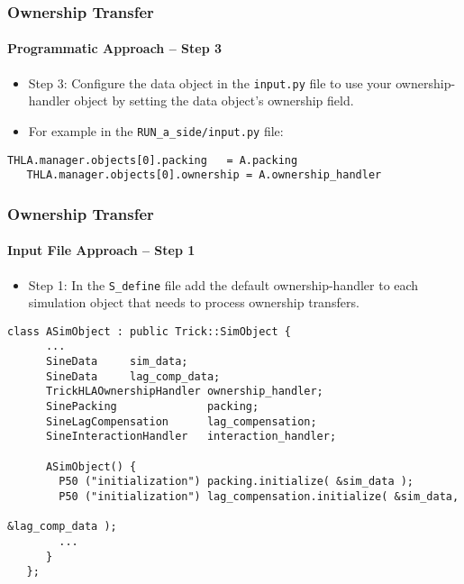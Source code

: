    \begin{frame}[fragile]
      \frametitle{Ownership Transfer}
      \framesubtitle{Programmatic Approach – Step 3}
      \begin{itemize}
         \item Step 3: Configure the data object in the \texttt{input.py} file
         to use your ownership-handler object by setting the data object’s
         ownership field.
         \item For example in the \texttt{RUN\_a\_side/input.py} file:
      \end{itemize}
      \vspace{0.2cm}
\begin{Verbatim}[frame=single, fontsize=\small]
   THLA.manager.objects[0].packing   = A.packing
   THLA.manager.objects[0].ownership = A.ownership_handler
\end{Verbatim}
   \end{frame}

   \begin{frame}[fragile]
      \frametitle{Ownership Transfer}
      \framesubtitle{Input File Approach – Step 1}
      \begin{itemize}
         \item Step 1: In the \texttt{S\_define} file add the default
         ownership-handler to each simulation object that needs to process
         ownership transfers.
      \end{itemize}
      \vspace{0.2cm}
\begin{Verbatim}[frame=single, fontsize=\scriptsize]
   class ASimObject : public Trick::SimObject {
      ...
      SineData     sim_data;
      SineData     lag_comp_data;
      TrickHLAOwnershipHandler ownership_handler;
      SinePacking              packing;
      SineLagCompensation      lag_compensation;
      SineInteractionHandler   interaction_handler;

      ASimObject() {
        P50 ("initialization") packing.initialize( &sim_data );
        P50 ("initialization") lag_compensation.initialize( &sim_data, 
                                                            &lag_comp_data );
        ...
      }
   };
\end{Verbatim}
   \end{frame}

